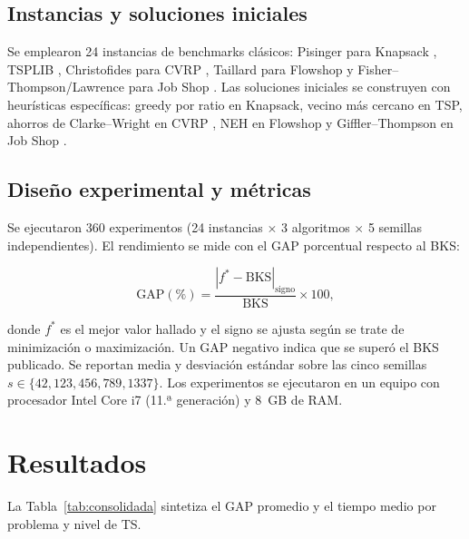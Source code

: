 \documentclass[12pt]{article}
\begin{document}
\subsection{Instancias y soluciones iniciales}

Se emplearon 24 instancias de benchmarks clásicos: Pisinger para Knapsack
\citep{pisinger2005hard}, TSPLIB \citep{reinelt1991tsplib}, Christofides
para CVRP \citep{christofides1979vehicle}, Taillard para Flowshop
\citep{taillard1993benchmarks} y Fisher--Thompson/Lawrence para Job Shop
\citep{fisher1963probabilistic,lawrence1984resource}. Las soluciones
iniciales se construyen con heurísticas específicas: greedy por ratio en
Knapsack, vecino más cercano en TSP, ahorros de Clarke--Wright en CVRP
\citep{clarke1964scheduling}, NEH en Flowshop \citep{nawaz1983heuristic} y
Giffler--Thompson en Job Shop \citep{giffler1960algorithms}.

\subsection{Diseño experimental y métricas}

Se ejecutaron 360 experimentos (24 instancias $\times$ 3 algoritmos
$\times$ 5 semillas independientes). El rendimiento se mide con el GAP
porcentual respecto al BKS:

\begin{equation}
  \text{GAP}(\%) = \frac{|f^{*} - \text{BKS}|_{\text{signo}}}{\text{BKS}}
  \times 100,
  \label{eq:gap}
\end{equation}

\noindent
donde $f^{*}$ es el mejor valor hallado y el signo se ajusta según se trate
de minimización o maximización. Un GAP negativo indica que se superó el
BKS publicado. Se reportan media y desviación estándar sobre las cinco
semillas $s \in \{42, 123, 456, 789, 1337\}$. Los experimentos se
ejecutaron en un equipo con procesador Intel Core i7 (11.ª generación) y
8~GB de RAM.

\section{Resultados}

La Tabla~\ref{tab:consolidada} sintetiza el GAP promedio y el tiempo medio
por problema y nivel de TS.
\end{document}
